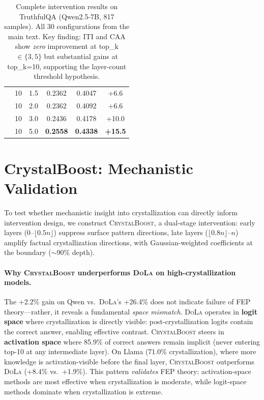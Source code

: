 \documentclass{article}
\newcommand{\iti}{\textsc{ITI}}
\newcommand{\dola}{\textsc{DoLa}}
\newcommand{\crystalboost}{\textsc{CrystalBoost}}
\newcommand{\caa}{\textsc{CAA}}
\begin{document}
\begin{table}[h]
\begin{tabular}{lccccc}
 & 10 & 1.5 & 0.2362 & 0.4047 & +6.6 \\
 & 10 & 2.0 & 0.2362 & 0.4092 & +6.6 \\
 & 10 & 3.0 & 0.2436 & 0.4178 & +10.0 \\
 & 10 & 5.0 & \textbf{0.2558} & \textbf{0.4338} & \textbf{+15.5} \\
\bottomrule
\end{tabular}
\caption{Complete intervention results on TruthfulQA (Qwen2.5-7B, 817 samples). All 30 configurations from the main text. Key finding: \iti{} and \caa{} show \emph{zero} improvement at top\_k$\in\{3,5\}$ but substantial gains at top\_k=10, supporting the layer-count threshold hypothesis.}
\label{tab:full_intervention_results}
\end{table}

\section{CrystalBoost: Mechanistic Validation}
\label{app:crystalboost}

To test whether mechanistic insight into crystallization can directly inform intervention design, we construct \crystalboost{}, a dual-stage intervention: early layers (0--$\lfloor 0.5n \rfloor$) suppress surface pattern directions, late layers ($\lfloor 0.8n \rfloor$--$n$) amplify factual crystallization directions, with Gaussian-weighted coefficients at the boundary ($\sim$90\% depth).

\paragraph{Why \crystalboost{} underperforms \dola{} on high-crystallization models.} The +2.2\% gain on Qwen vs.\ \dola{}'s +26.4\% does not indicate failure of FEP theory---rather, it reveals a fundamental \emph{space mismatch}. \dola{} operates in \textbf{logit space} where crystallization is directly visible: post-crystallization logits contain the correct answer, enabling effective contrast. \crystalboost{} steers in \textbf{activation space} where 85.9\% of correct answers remain implicit (never entering top-10 at any intermediate layer). On Llama (71.0\% crystallization), where more knowledge is activation-visible before the final layer, \crystalboost{} outperforms \dola{} (+8.4\% vs.\ +1.9\%). This pattern \emph{validates} FEP theory: activation-space methods are most effective when crystallization is moderate, while logit-space methods dominate when crystallization is extreme.
\end{document}
